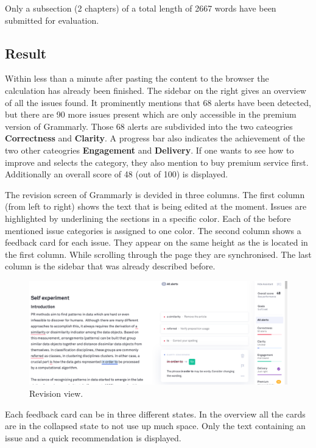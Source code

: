 \documentclass[runningheads]{llncs}
\let\OldTextregistered\textregistered
\renewcommand{\textregistered}{\OldTextregistered\xspace}
\begin{document}
Only a subsection (2 chapters) of a total length of 2667 words have been submitted for evaluation.

\subsection{Result}
Within less than a minute after pasting the content to the browser the calculation has already been finished. The sidebar on the right gives an overview of all the issues found. It prominently mentions that 68 alerts have been detected, but there are 90 more issues present which are only accessible in the premium version of Grammarly\textregistered. Those 68 alerts are subdivided into the two cateogries \textbf{Correctness} and \textbf{Clarity}. A progress bar also indicates the achievement of the two other cateogries \textbf{Engagement} and \textbf{Delivery}. If one wants to see how to improve and selects the category, they also mention to buy premium service first. Additionally an overall score of 48 (out of 100) is displayed.

The revision screen of Grammarly\textregistered is devided in three columns. The first column (from left to right) shows the text that is being edited at the moment. Issues are highlighted by underlining the sections in a specific color. Each of the before mentioned issue categories is assigned to one color. The second column shows a feedback card for each issue. They appear on the same height as the is located in the first column. While scrolling through the page they are synchronised. The last column  is the sidebar that was already described before. 

\begin{figure}[H]
  \includegraphics[width=\linewidth]{images/view.png}
  \caption{Revision view.}
  \label{fig:revision}
\end{figure}

Each feedback card can be in three different states. In the overview all the cards are in the collapsed state to not use up much space. Only the text containing an issue and a quick recommendation is displayed.
\end{document}
